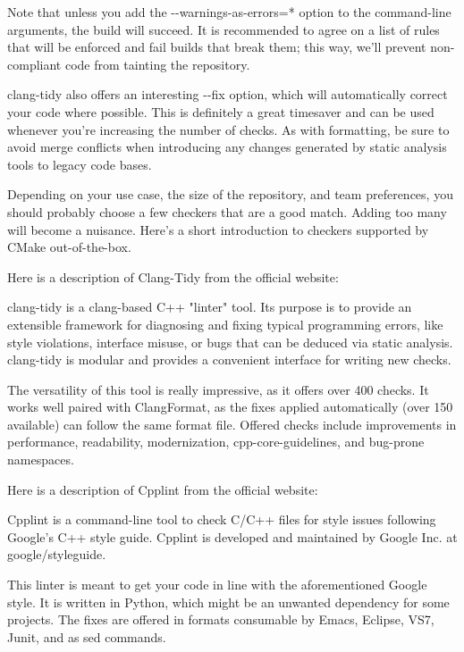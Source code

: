 Note that unless you add the -{}-warnings-as-errors=* option to the command-line arguments, the build will succeed. It is recommended to agree on a list of rules that will be enforced and fail builds that break them; this way, we'll prevent non-compliant code from tainting the repository.

clang-tidy also offers an interesting -{}-fix option, which will automatically correct your code where possible. This is definitely a great timesaver and can be used whenever you're increasing the number of checks. As with formatting, be sure to avoid merge conflicts when introducing any changes generated by static analysis tools to legacy code bases.

Depending on your use case, the size of the repository, and team preferences, you should probably choose a few checkers that are a good match. Adding too many will become a nuisance. Here's a short introduction to checkers supported by CMake out-of-the-box.


Here is a description of Clang-Tidy from the official website:

clang-tidy is a clang-based C++ "linter" tool. Its purpose is to provide an extensible framework for diagnosing and fixing typical programming errors, like style violations, interface misuse, or bugs that can be deduced via static analysis. clang-tidy is modular and provides a convenient interface for writing new checks.

The versatility of this tool is really impressive, as it offers over 400 checks. It works well paired with ClangFormat, as the fixes applied automatically (over 150 available) can follow the same format file. Offered checks include improvements in performance, readability, modernization, cpp-core-guidelines, and bug-prone namespaces.



Here is a description of Cpplint from the official website:

Cpplint is a command-line tool to check C/C++ files for style issues following Google's C++ style guide. Cpplint is developed and maintained by Google Inc. at google/styleguide.

This linter is meant to get your code in line with the aforementioned Google style. It is written in Python, which might be an unwanted dependency for some projects. The fixes are offered in formats consumable by Emacs, Eclipse, VS7, Junit, and as sed commands.


